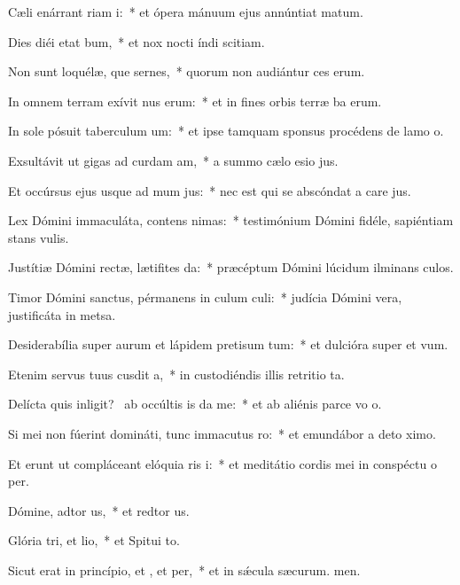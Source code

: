 \item Cæli enárrant riam i:~* et ópera mánuum ejus annúntiat matum.
\item Dies diéi etat bum,~* et nox nocti índi scitiam.
\item Non sunt loquélæ, que sernes,~* quorum non audiántur ces erum.
\item In omnem terram exívit nus erum:~* et in fines orbis terræ ba erum.
\item In sole pósuit taberculum um:~* et ipse tamquam sponsus procédens de lamo o.
\item Exsultávit ut gigas ad curdam am,~* a summo cælo esio jus.
\item Et occúrsus ejus usque ad mum jus:~* nec est qui se abscóndat a care jus.
\item Lex Dómini immaculáta, contens nimas:~* testimónium Dómini fidéle, sapiéntiam stans vulis.
\item Justítiæ Dómini rectæ, lætifites da:~* præcéptum Dómini lúcidum ilminans culos.
\item Timor Dómini sanctus, pérmanens in culum culi:~* judícia Dómini vera, justificáta in metsa.
\item Desiderabília super aurum et lápidem pretisum tum:~* et dulcióra super  et vum.
\item Etenim servus tuus cusdit a,~* in custodiéndis illis retritio ta.
\item Delícta quis inligit?~\pscross{} ab occúltis is da me:~* et ab aliénis parce vo o.
\item Si mei non fúerint domináti, tunc immacutus ro:~* et emundábor a deto ximo.
\item Et erunt ut compláceant elóquia ris i:~* et meditátio cordis mei in conspéctu o per.
\item Dómine, adtor us,~* et redtor us.
\item Glória tri, et lio,~* et Spitui to.
\item Sicut erat in princípio, et , et per,~* et in sǽcula sæcurum. men.
